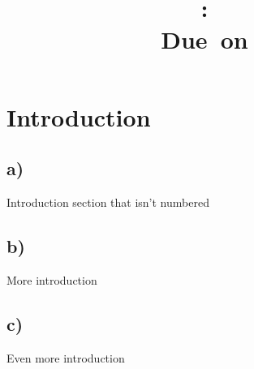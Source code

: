 \documentclass{article}
\title{
    \vspace{2in}
    \textmd{\textbf{\hmwkClass:\ \hmwkTitle}}\\
    \normalsize\vspace{0.1in}\small{Due\ on\ \hmwkDueDate}\\
    \vspace{2in}
}
\author{\hmwkAuthorName}
\date{}
\begin{document}
\maketitle
\pagebreak


\setcounter{secnumdepth}{0} %
\section{Introduction}
\subsection{a)}
Introduction section that isn't numbered
\subsection{b)}
More introduction
\subsection{c)}
Even more introduction


\end{document}
